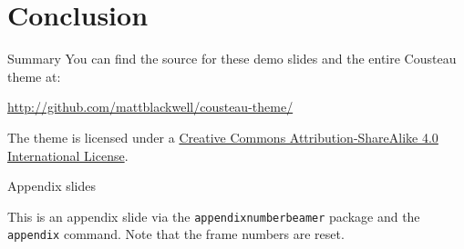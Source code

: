 \documentclass{beamer}
\begin{document}

 
\section{Conclusion}

\begin{frame}{Summary}
  You can find the source for these demo slides and the entire Cousteau theme at:
  \begin{center}
    \url{http://github.com/mattblackwell/cousteau-theme/}
  \end{center}

  The theme is licensed under a
  \href{http://creativecommons.org/licenses/by-sa/4.0/}{Creative Commons
  Attribution-ShareAlike 4.0 International License}.

  \begin{center}\ccbysa\end{center}

  
\end{frame}

\appendix

\begin{frame}{Appendix slides}

  This is an appendix slide via the \texttt{appendixnumberbeamer} package and the \texttt{\\appendix} command. Note that the frame numbers are reset. 
  
\end{frame}
\end{document}
